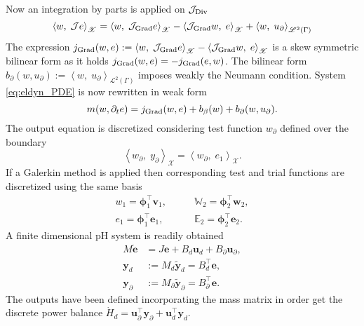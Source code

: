 Now an integration by parts is applied on $\mathcal{J}_{\operatorname*{Div}}$
\begin{equation}
\left\langle w, \; \mathcal{J} e \right\rangle_{\mathscr{X}} = \left\langle w, \; \mathcal{J}_{\operatorname*{Grad}} e \right\rangle_{\mathscr{X}} - \left\langle \mathcal{J}_{\operatorname*{Grad}} w, \; e \right\rangle_{\mathscr{X}} + \left\langle w, \; u_\partial \right\rangle_{\mathscr{L}^2(\Gamma)}
\end{equation}
The expression $j_{\operatorname*{Grad}}(w, e) :=\left\langle w, \; \mathcal{J}_{\operatorname*{Grad}} e \right\rangle_{\mathscr{X}} - \left\langle \mathcal{J}_{\operatorname*{Grad}} w, \; e \right\rangle_{\mathscr{X}}$ is a skew symmetric bilinear form as it holds $j_{\operatorname*{Grad}}(w, e)=-j_{\operatorname*{Grad}}(e, w)$. The bilinear form $b_{\partial}(w, u_\partial) := \left\langle w, \; u_\partial \right\rangle_{\mathscr{L}^2(\Gamma)}$ imposes weakly the Neumann condition. System \eqref{eq:eldyn_PDE} is now rewritten in weak form
\begin{equation}
m(w, \partial_t e) = j_{\operatorname*{Grad}}(w, e) + b_\beta(w) + b_{\partial}(w, u_\partial).
\end{equation}
The output equation is discretized considering test function $w_\partial$ defined over the boundary
\begin{equation}
\left\langle w_\partial, \; y_\partial \right\rangle_{\mathscr{X}} = \left\langle w_\partial, \; e_1 \right\rangle_{\mathscr{X}}.
\end{equation}
If a Galerkin method is applied then corresponding test and trial functions are discretized using the same basis
\begin{equation*}
\begin{aligned}
w_1 = \bm{\phi}_1^\top \bm{v}_1, \\
e_1 = \bm{\phi}_1^\top \bm{e}_1, 
\end{aligned} \qquad
\begin{aligned}
\mathbb{W}_2 = \bm{\phi}_2^\top \bm{w}_2, \\
\mathbb{E}_2 = \bm{\phi}_2^\top \bm{e}_2. 
\end{aligned}
\end{equation*}
A finite dimensional pH system is readily obtained
\begin{equation}
\begin{aligned}
{M} \dot{\bm{e}} &= J \bm{e} + {B}_d \bm{u}_d + {B}_\partial \bm{u}_\partial, \\
\bm{y}_d &:= {M}_d \widetilde{\bm{y}}_d = {B}_d^\top \bm{e},  \\
\bm{y}_\partial &:= {M}_\partial \widetilde{\bm{y}}_\partial = {B}_\partial^\top \bm{e}.
\end{aligned}
\end{equation}
The outputs have been defined incorporating the mass matrix in order get the discrete power balance $\dot{H}_d = \bm{u}_\partial^\top \bm{y}_\partial + \bm{u}_d^\top \bm{y}_d$.

